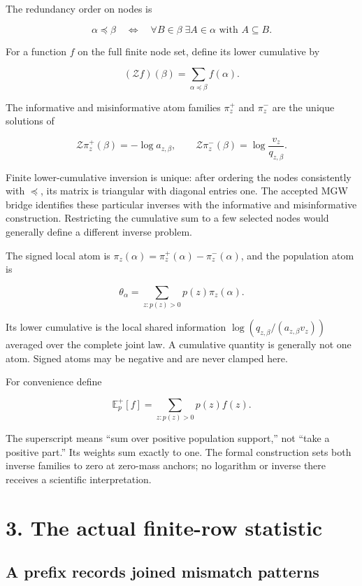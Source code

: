 \documentclass[11pt,a4paper]{article}
\begin{document}
The redundancy order on nodes is

\[
\alpha\preceq\beta
\quad\Longleftrightarrow\quad
\forall B\in\beta\;\exists A\in\alpha\text{ with }A\subseteq B.
\]

For a function \(f\) on the full finite node set, define its lower cumulative by

\[
(\mathcal Zf)(\beta)=\sum_{\alpha\preceq\beta}f(\alpha).
\]

The informative and misinformative atom families \(\pi_z^+\) and \(\pi_z^-\) are the unique solutions of

\[
\mathcal Z\pi_z^+(\beta)=-\log a_{z,\beta},
\qquad
\mathcal Z\pi_z^-(\beta)=\log\frac{v_z}{q_{z,\beta}}. \tag{2}
\]

Finite lower-cumulative inversion is unique: after ordering the nodes consistently with \(\preceq\), its matrix is triangular with diagonal entries one. The accepted MGW bridge identifies these particular inverses with the informative and misinformative construction. Restricting the cumulative sum to a few selected nodes would generally define a different inverse problem.

The signed local atom is \(\pi_z(\alpha)=\pi_z^+(\alpha)-\pi_z^-(\alpha)\), and the population atom is

\[
\theta_\alpha=\sum_{z:p(z)>0}p(z)\pi_z(\alpha). \tag{3}
\]

Its lower cumulative is the local shared information \(\log(q_{z,\beta}/(a_{z,\beta}v_z))\) averaged over the complete joint law. A cumulative quantity is generally not one atom. Signed atoms may be negative and are never clamped here.

For convenience define

\[
\mathbb E_p^+[f]=\sum_{z:p(z)>0}p(z)f(z). \tag{4}
\]

The superscript means ``sum over positive population support,'' not ``take a positive part.'' Its weights sum exactly to one. The formal construction sets both inverse families to zero at zero-mass anchors; no logarithm or inverse there receives a scientific interpretation.

\section{3. The actual finite-row statistic}\label{the-actual-finite-row-statistic}

\subsection{A prefix records joined mismatch patterns}\label{a-prefix-records-joined-mismatch-patterns}
\end{document}
